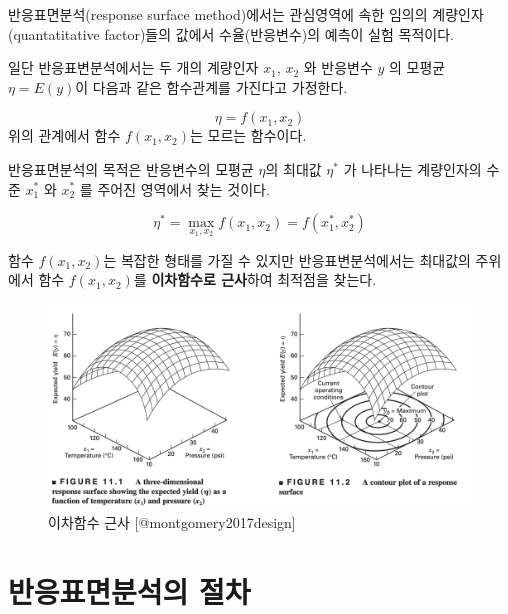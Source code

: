 \documentclass[
]{book}
\theoremstyle{definition}
\theoremstyle{definition}
\theoremstyle{definition}
\theoremstyle{definition}
\theoremstyle{remark}
\begin{document}
반응표면분석(response surface method)에서는 관심영역에 속한 임의의 계량인자(quantatitative factor)들의 값에서 수율(반응변수)의 예측이 실험 목적이다.

일단 반응표변분석에서는 두 개의 계량인자 \(x_1\), \(x_2\) 와 반응변수 \(y\) 의 모평균 \(\eta =E(y)\)이 다음과 같은 함수관계를 가진다고 가정한다.

\[ \eta = f(x_1, x_2) \]
위의 관계에서 함수 \(f(x_1, x_2)\)는 모르는 함수이다.

반응표면분석의 목적은 반응변수의 모평균 \(\eta\)의 최대값 \(\eta^*\) 가 나타나는 계량인자의 수준 \(x_1^*\) 와 \(x_2^*\) 를
주어진 영역에서 찾는 것이다.

\[   \eta^* = \max_{x_1, x_2} f(x_1, x_2) =f(x_1^*, x_2^*) \]

함수 \(f(x_1, x_2)\)는 복잡한 형태를 가질 수 있지만 반응표변분석에서는 최대값의 주위에서 함수 \(f(x_1, x_2)\)를 \textbf{이차함수로 근사}하여 최적점을 찾는다.

\begin{figure}

{\centering \includegraphics[width=1\linewidth]{myimages/response-01} 

}

\caption{이차함수 근사 [@montgomery2017design]}\label{fig:plot1}
\end{figure}

\hypertarget{uxbc18uxc751uxd45cuxba74uxbd84uxc11duxc758-uxc808uxcc28}{%
\section{반응표면분석의 절차}\label{uxbc18uxc751uxd45cuxba74uxbd84uxc11duxc758-uxc808uxcc28}}
\end{document}
